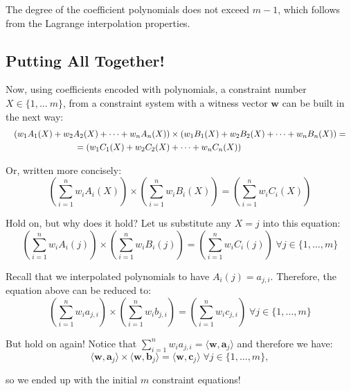 \documentclass[../lecture-notes-148x210.tex]{subfiles}
\begin{document}
\begin{remark}
    The degree of the coefficient polynomials does not exceed $m - 1$, which follows from the Lagrange interpolation properties.
\end{remark}

\subsection{Putting All Together!}

Now, using coefficients encoded with polynomials, a constraint number $X \in \{1, \dots\ m\}$, from
a constraint system with a witness vector $\mathbf{w}$ can be built in the next way:
\begin{equation*} 
    \scalebox{0.9}{$
    \begin{aligned}
        (w_1A_1(X) + w_2A_2(X) + \dots + w_nA_n(X)) &\times (w_1B_1(X) + w_2B_2(X) + \dots + w_nB_n(X)) =\\ = (w_1C_1(X) + w_2C_2(X)& + \dots + w_nC_n(X))
    \end{aligned}
    $}
\end{equation*}

Or, written more concisely:
\begin{equation*}
    \left( \sum_{i = 1}^{n} w_iA_i(X) \right) \times \left( \sum_{i = 1}^{n} w_iB_i(X) \right) = \left( \sum_{i = 1}^{n} w_iC_i(X) \right)
\end{equation*}

\begin{remark}
    Hold on, but why does it hold? Let us substitute any $X=j$ into this equation:
    \begin{equation*}
        \left( \sum_{i = 1}^{n} w_iA_i(j) \right) \times \left( \sum_{i = 1}^{n} w_iB_i(j) \right) = \left( \sum_{i = 1}^{n} w_iC_i(j) \right) \; \forall j \in \{1,\dots,m\}
    \end{equation*}

    Recall that we interpolated polynomials to have $A_i(j) = a_{j,i}$. Therefore, the equation above can be reduced to:
    \begin{equation*}
        \left( \sum_{i = 1}^{n} w_ia_{j,i} \right) \times \left( \sum_{i = 1}^{n} w_ib_{j,i} \right) = \left( \sum_{i = 1}^{n} w_ic_{j,i} \right) \; \forall j \in \{1,\dots,m\}
    \end{equation*}

    But hold on again! Notice that $\sum_{i = 1}^{n} w_ia_{j,i} = \langle \mathbf{w}, \mathbf{a}_j \rangle$ and therefore we have:
    \begin{equation*}
        \langle \mathbf{w}, \mathbf{a}_j \rangle \times \langle \mathbf{w}, \mathbf{b}_j \rangle = \langle \mathbf{w}, \mathbf{c}_j \rangle \; \forall j \in \{1,\dots,m\},
    \end{equation*}
    
    so we ended up with the initial $m$ constraint equations!
\end{remark}
\end{document}
